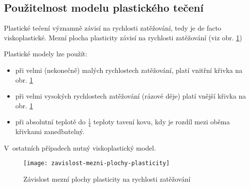 
\subsection{Použitelnost modelu plastického tečení}
Plastické tečení významně závisí na rychlosti zatěžování, tedy je de facto viskoplastické. Mezní plocha plasticity závisí na rychlosti zatěžování (viz obr. \ref{fig:zavislost-mezni-plochy-plasticity})

Plastické modely lze použít:
\begin{itemize}
	\item při velmi (nekonečně) malých rychlostech zatěžování, platí vnitřní křivka na obr. \ref{fig:zavislost-mezni-plochy-plasticity}
	\item při velmi vysokých rychlostech zatěžování (rázové děje) platí vnější křivka na obr. \ref{fig:zavislost-mezni-plochy-plasticity}
	\item při absolutní teplotě do $\tfrac{1}{4}$ teploty tavení kovu, kdy je rozdíl mezi oběma křivkami zanedbatelný. 
\end{itemize}
V~ostatních případech nutný viskoplastický model.

\begin{figure}
	\label{fig:zavislost-mezni-plochy-plasticity}
	\centering
	\texttt{[image: zavislost-mezni-plochy-plasticity]}
	\caption{Závislost mezní plochy plasticity na rychlosti zatěžování}
\end{figure}

